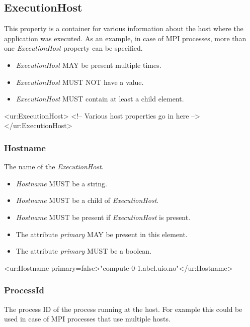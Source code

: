 \subsection{ExecutionHost} \label{ComputeHost}

This property is a container for various information about the host where the application was executed.  As an example, in case of MPI processes, more than one \emph{ExecutionHost} property can be specified. 
\begin{itemize}
\item \emph{ExecutionHost} MAY be present multiple times.
\item \emph{ExecutionHost} MUST NOT have a value.
\item \emph{ExecutionHost} MUST contain at least a child element.
\end{itemize}

\begin{XMLexample}
<ur:ExecutionHost>
  <!-- Various host properties go in here -->
</ur:ExecutionHost>
\end{XMLexample}

\subsubsection{Hostname}

The name of the \emph{ExecutionHost}.
\begin{itemize}
\item \emph{Hostname} MUST be a string.
\item \emph{Hostname} MUST be a child of \emph{ExecutionHost}.
\item \emph{Hostname} MUST be present if \emph{ExecutionHost} is present.
\item The attribute \emph{primary} MAY be present in this element.
\item The attribute \emph{primary} MUST be a boolean.
\end{itemize}

\begin{XMLexample}
<ur:Hostname primary=false>"compute-0-1.abel.uio.no"</ur:Hostname>
\end{XMLexample}

\subsubsection{ProcessId}

The process ID of the process running at the host. For example this could be used in case of MPI processes that use multiple hosts.

